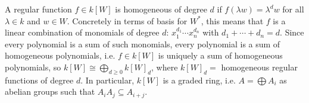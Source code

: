 A regular function $f \in k[W]$ is homogeneous of degree $d$ if $f(\lambda w)=\lambda^d w$ for all $\lambda \in k$ and $w \in W$. Concretely in terms of basis for $W^*$, this means that $f$ is a linear combination of monomials of degree $d$: $x_1^{d_1} \cdots x_n^{d_n}$ with $d_1+\cdots+d_n=d$. Since every polynomial is a sum of such monomials, every polynomial is a sum of homogeneous polynomials, i.e. $f \in k[W]$ is uniquely a sum of homogeneous polynomials, so $k[W] \cong \bigoplus_{d \geq 0} k[W]_d$, where $k[W]_d=$ homogeneous regular functions of degree $d$. In particular, $k[W]$ is a graded ring, i.e. $A= \bigoplus A_i$ as abelian groups such that $A_iA_j \subseteq A_{i+j}$. 









































